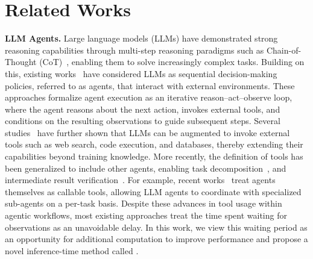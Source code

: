 \section{Related Works}
\label{sec:related-works}
\textbf{LLM Agents.}
Large language models (LLMs) have demonstrated strong reasoning capabilities through multi-step reasoning paradigms such as Chain-of-Thought (CoT)~\cite{wei2022chain}, enabling them to solve increasingly complex tasks.
Building on this, existing works~\cite{yao2022react, sarukkai2025react2, rawat2025pre, zhang2024codeagent} have considered LLMs as sequential decision-making policies, referred to as agents, that interact with external environments.
These approaches formalize agent execution as an iterative reason–act–observe loop, where the agent reasons about the next action, invokes external tools, and conditions on the resulting observations to guide subsequent steps.
Several studies~\cite{schick2023toolformer, qu2025toollearning, zhang2024codeagent} have further shown that LLMs can be augmented to invoke external tools such as web search, code execution, and databases, thereby extending their capabilities beyond training knowledge. More recently, the definition of tools has been generalized to include other agents, enabling task decomposition~\cite{fourney2024magentic, zhang2025agentorchestra}, and intermediate result verification~\cite{lifshitz2025multi}.
For example, recent works~\cite{zhang2025agentastool, jiang2025agentadaptation} treat agents themselves as callable tools, allowing LLM agents to coordinate with specialized sub-agents on a per-task basis.
Despite these advances in tool usage within agentic workflows, most existing approaches treat the time spent waiting for observations as an unavoidable delay.
In this work, we view this waiting period as an opportunity for additional computation to improve performance and propose a novel inference-time method called \mname.


